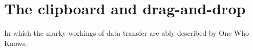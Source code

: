 \chapter{The clipboard and drag-and-drop}\label{chapclipboard}
%
%
\setfooter{\thepage}{}{}{}{}{\thepage}%

In which the murky workings of data transfer are ably described by One Who Knows.

